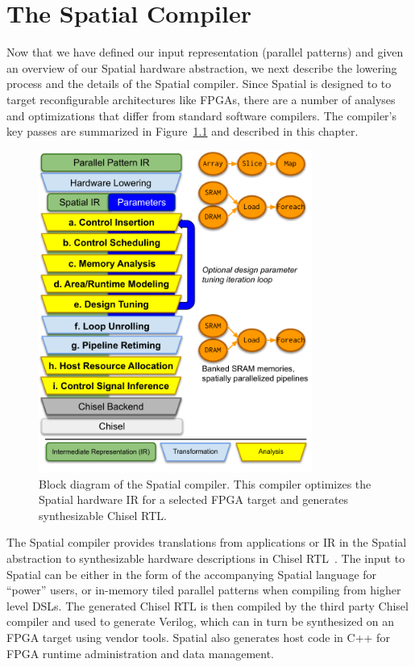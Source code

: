 \chapter{The Spatial Compiler}
\label{compiler}

Now that we have defined our input representation (parallel patterns) and given
an overview of our Spatial hardware abstraction, we next describe the lowering
process and the details of the Spatial compiler. Since Spatial is designed to
to target reconfigurable architectures like FPGAs, there are a
number of analyses and optimizations that differ from standard software compilers.
The compiler's key passes are summarized in Figure~\ref{fig:spatial-diag} and
described in this chapter.

\begin{figure}
\centering
\includegraphics[width=0.8\textwidth]{5-compiler/figs/spatial-diag}
\caption{\label{fig:spatial-diag}Block diagram of the Spatial compiler.
This compiler optimizes the Spatial hardware IR for a selected FPGA target
and generates synthesizable Chisel RTL.}
\end{figure}

The Spatial compiler provides translations from applications or IR
in the Spatial abstraction to synthesizable hardware descriptions in Chisel RTL~\cite{chisel}.
The input to Spatial can be either in the form of the accompanying Spatial language for ``power'' users,
or in-memory tiled parallel patterns when compiling from higher level DSLs.
The generated Chisel RTL is then compiled by the third party Chisel compiler and used
to generate Verilog, which can in turn be synthesized on an FPGA target using vendor tools.
Spatial also generates host code in C++ for FPGA runtime administration and data management.




